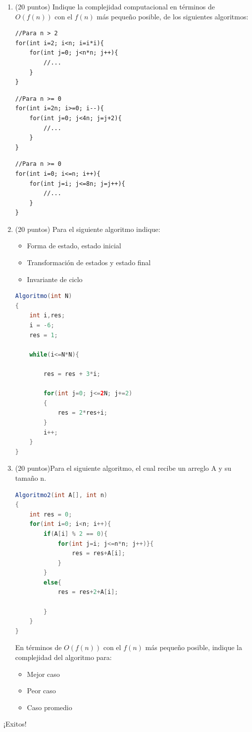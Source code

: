 \documentclass[10pt,twocolumn]{article}
\begin{document}
\begin{enumerate}
	\item (20 puntos) Indique la complejidad computacional en términos de $O(f(n))$ con el $f(n)$ más pequeño posible, de los siguientes algoritmos:

\begin{lstlisting}
//Para n > 2
for(int i=2; i<n; i=i*i){
	for(int j=0; j<n*n; j++){
		//...	
	}
}
\end{lstlisting} 
\begin{lstlisting}
//Para n >= 0
for(int i=2n; i>=0; i--){
	for(int j=0; j<4n; j=j+2){
		//...	
	}
}
\end{lstlisting} 	
\begin{lstlisting}
//Para n >= 0
for(int i=0; i<=n; i++){
	for(int j=i; j<=8n; j=j++){
		//...	
	}
}
\end{lstlisting} 	

	\item (20 puntos) Para el siguiente algoritmo indique:
	\begin{itemize}
		\item Forma de estado, estado inicial
		\item Transformación de estados y estado final
		\item Invariante de ciclo
	\end{itemize}
\begin{lstlisting}[language=Java]
Algoritmo(int N)
{
	int i,res;
	i = -6;
	res = 1;	
	
	while(i<=N*N){
		
		res = res + 3*i;
		
		for(int j=0; j<=2N; j+=2)
		{
			res = 2*res+i;
		}
		i++;
	}
}
\end{lstlisting} 
	\item (20 puntos)Para el siguiente algoritmo, el cual recibe un arreglo A y su tamaño n.

\begin{lstlisting}[language=Java]
Algoritmo2(int A[], int n)
{
	int res = 0;
	for(int i=0; i<n; i++){
		if(A[i] % 2 == 0){
			for(int j=i; j<=n*n; j++)}{
				res = res+A[i];	
			}
		}
		else{
			res = res+2+A[i];	

		}
	}
}
\end{lstlisting} 
En términos de $O(f(n))$ con el $f(n)$ más pequeño posible, indique la complejidad del algoritmo para:
\begin{itemize}
	\item Mejor caso
	\item Peor caso
	\item Caso promedio
\end{itemize}
	\end{enumerate}
\begin{center}
	\huge{¡Exitos!}
\end{center}	
	
\end{document}
